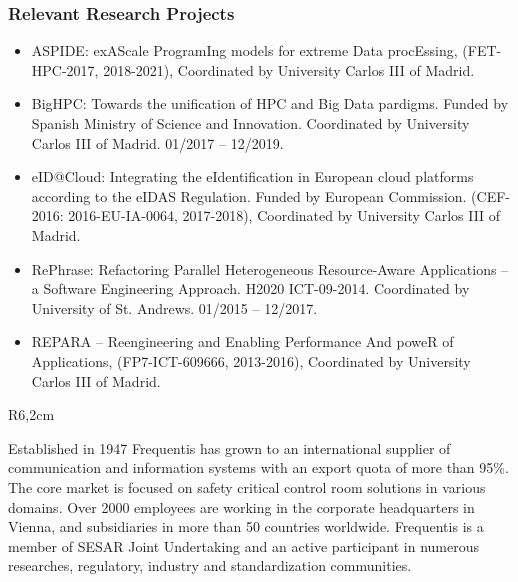 \documentclass[a4paper,11pt]{article}
\begin{document}
\subsubsection*{Relevant Research Projects}

\begin{itemize}

\item
ASPIDE: exAScale ProgramIng models for extreme Data procEssing,
(FET-HPC-2017, 2018-2021),
Coordinated by University Carlos III of Madrid.

\item
BigHPC: Towards the unification of HPC and Big Data pardigms.
Funded by Spanish Ministry of Science and Innovation.
Coordinated by University Carlos III of Madrid.
01/2017 -- 12/2019.

\item eID@Cloud: Integrating the eIdentification in European
cloud platforms according to the eIDAS Regulation.
Funded by European Commission.
(CEF-2016: 2016-EU-IA-0064, 2017-2018),
Coordinated by University Carlos III of Madrid.

\item RePhrase: Refactoring Parallel Heterogeneous Resource-Aware Applications -- a Software Engineering Approach.
H2020 ICT-09-2014.
Coordinated by University of St. Andrews.
01/2015 -- 12/2017.


\item REPARA -- Reengineering and Enabling Performance And poweR of Applications,
(FP7-ICT-609666, 2013-2016),
Coordinated by University Carlos III of Madrid.

\end{itemize}


\begin{wrapfigure}{R}{6,2cm}
\vspace{-3cm}
\hfill {}
\vspace{-1cm}
\end{wrapfigure}
\vspace{10pt}

Established in 1947 Frequentis has grown to an international supplier of communication and information systems with an export quota of more than 95\%. The core market is focused on safety critical control room solutions in various domains. Over 2000 employees are working in the corporate headquarters in Vienna, and subsidiaries in more than 50 countries worldwide. Frequentis is a member of SESAR Joint Undertaking and an active participant in numerous researches, regulatory, industry and standardization communities.
\end{document}
